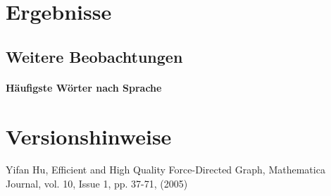 \documentclass[12pt, a4paper]{article}
\begin{document}
\section{Ergebnisse}
\subsection{Weitere Beobachtungen}
\paragraph{H\"aufigste W\"orter nach Sprache}
\section{Versionshinweise}

\newpage
\begin{thebibliography}{9}
	 Yifan Hu, Efficient and High Quality Force-Directed Graph, Mathematica Journal, vol. 10, Issue 1, pp. 37-71, (2005)
\end{thebibliography}
\end{document}
